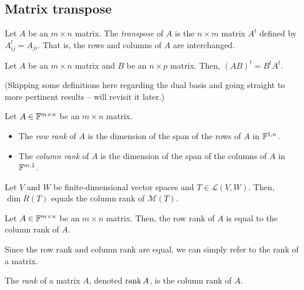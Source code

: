 \documentclass{article}
\begin{document}
\subsection{Matrix transpose}

\begin{definition}
  Let $A$ be an $m \times n$ matrix.
  The \emph{transpose} of $A$ is the $n \times m$ matrix $A^t$ defined by $A_{ij}^t = A_{ji}$.
  That is, the rows and columns of $A$ are interchanged.
\end{definition}

\begin{theorem}
  Let $A$ be an $m \times n$ matrix and $B$ be an $n \times p$ matrix.
  Then, $(AB)^t = B^tA^t$.
\end{theorem}

(Skipping some definitions here regarding the dual basis and going straight to more pertinent results -- will revisit it later.)

\begin{definition}
  Let $A \in \mathbb{F}^{m \times n}$ be an $m \times n$ matrix.
  \begin{itemize}
    \item The \emph{row rank} of $A$ is the dimension of the span of the rows of $A$ in $\mathbb{F}^{1, n}$.
    \item The \emph{column rank} of $A$ is the dimension of the span of the columns of $A$ in $\mathbb{F}^{m, 1}$.
  \end{itemize}
\end{definition}

\begin{theorem}
  Let $V$ and $W$ be finite-dimensional vector spaces and $T \in \mathcal{L}(V, W)$.
  Then, $\dim R(T)$ equals the column rank of $\mathcal{M}(T)$.
\end{theorem}

\begin{theorem}
  Let $A \in \mathbb{F}^{m \times n}$ be an $m \times n$ matrix.
  Then, the row rank of $A$ is equal to the column rank of $A$.
\end{theorem}

Since the row rank and column rank are equal, we can simply refer to the rank of a matrix.

\begin{definition}[Rank]
  The \emph{rank} of a matrix $A$, denoted $\rank A$, is the column rank of $A$.
\end{definition}
\end{document}
